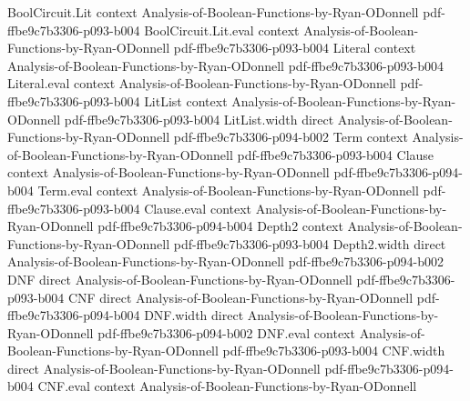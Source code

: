 \begin{lemma}
\label{BoolBLR.linear_bool_iff_character}
\leanok
{}
\proofstep
  {BoolCircuit.Lit}
  {context}
  {Analysis-of-Boolean-Functions-by-Ryan-ODonnell}
  {pdf-ffbe9c7b3306-p093-b004}
\proofstep
  {BoolCircuit.Lit.eval}
  {context}
  {Analysis-of-Boolean-Functions-by-Ryan-ODonnell}
  {pdf-ffbe9c7b3306-p093-b004}
\proofstep
  {Literal}
  {context}
  {Analysis-of-Boolean-Functions-by-Ryan-ODonnell}
  {pdf-ffbe9c7b3306-p093-b004}
\proofstep
  {Literal.eval}
  {context}
  {Analysis-of-Boolean-Functions-by-Ryan-ODonnell}
  {pdf-ffbe9c7b3306-p093-b004}
\proofstep
  {LitList}
  {context}
  {Analysis-of-Boolean-Functions-by-Ryan-ODonnell}
  {pdf-ffbe9c7b3306-p093-b004}
\proofstep
  {LitList.width}
  {direct}
  {Analysis-of-Boolean-Functions-by-Ryan-ODonnell}
  {pdf-ffbe9c7b3306-p094-b002}
\proofstep
  {Term}
  {context}
  {Analysis-of-Boolean-Functions-by-Ryan-ODonnell}
  {pdf-ffbe9c7b3306-p093-b004}
\proofstep
  {Clause}
  {context}
  {Analysis-of-Boolean-Functions-by-Ryan-ODonnell}
  {pdf-ffbe9c7b3306-p094-b004}
\proofstep
  {Term.eval}
  {context}
  {Analysis-of-Boolean-Functions-by-Ryan-ODonnell}
  {pdf-ffbe9c7b3306-p093-b004}
\proofstep
  {Clause.eval}
  {context}
  {Analysis-of-Boolean-Functions-by-Ryan-ODonnell}
  {pdf-ffbe9c7b3306-p094-b004}
\proofstep
  {Depth2}
  {context}
  {Analysis-of-Boolean-Functions-by-Ryan-ODonnell}
  {pdf-ffbe9c7b3306-p093-b004}
\proofstep
  {Depth2.width}
  {direct}
  {Analysis-of-Boolean-Functions-by-Ryan-ODonnell}
  {pdf-ffbe9c7b3306-p094-b002}
\proofstep
  {DNF}
  {direct}
  {Analysis-of-Boolean-Functions-by-Ryan-ODonnell}
  {pdf-ffbe9c7b3306-p093-b004}
\proofstep
  {CNF}
  {direct}
  {Analysis-of-Boolean-Functions-by-Ryan-ODonnell}
  {pdf-ffbe9c7b3306-p094-b004}
\proofstep
  {DNF.width}
  {direct}
  {Analysis-of-Boolean-Functions-by-Ryan-ODonnell}
  {pdf-ffbe9c7b3306-p094-b002}
\proofstep
  {DNF.eval}
  {context}
  {Analysis-of-Boolean-Functions-by-Ryan-ODonnell}
  {pdf-ffbe9c7b3306-p093-b004}
\proofstep
  {CNF.width}
  {direct}
  {Analysis-of-Boolean-Functions-by-Ryan-ODonnell}
  {pdf-ffbe9c7b3306-p094-b004}
\proofstep
  {CNF.eval}
  {context}
  {Analysis-of-Boolean-Functions-by-Ryan-ODonnell}

\end{lemma}
